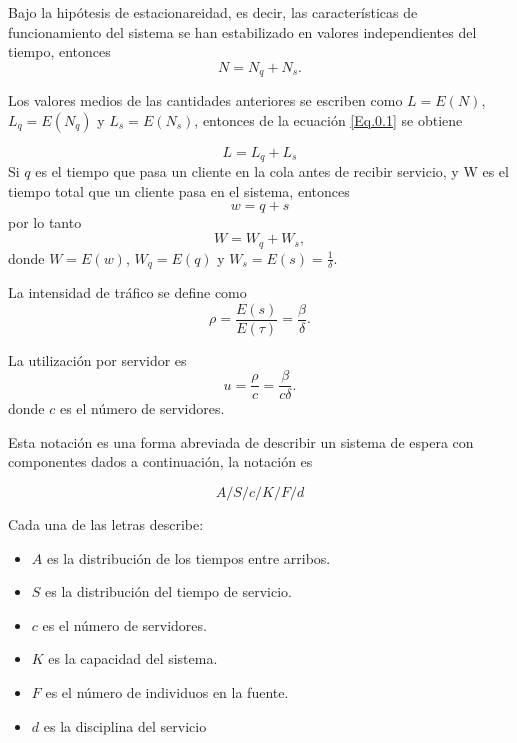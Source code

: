 \documentclass{article}
\begin{document}
Bajo la hip\'otesis de estacionareidad, es decir, las caracter\'isticas de funcionamiento del sistema se han estabilizado en valores independientes del tiempo, entonces
\begin{equation}
N=N_{q}+N_{s}.
\end{equation}

Los valores medios de las cantidades anteriores se escriben como $L=E\left(N\right)$, $L_{q}=E\left(N_{q}\right)$ y $L_{s}=E\left(N_{s}\right)$, entonces de la ecuaci\'on \ref{Eq.0.1} se obtiene

\begin{equation}
L=L_{q}+L_{s}
\end{equation}
Si $q$ es el tiempo que pasa un cliente en la cola antes de recibir servicio, y W es el tiempo total que un cliente pasa en el sistema, entonces \[w=q+s\] por lo tanto \[W=W_{q}+W_{s},\] donde $W=E\left(w\right)$, $W_{q}=E\left(q\right)$ y $W_{s}=E\left(s\right)=\frac{1}{\delta}$.

La intensidad de tr\'afico se define como
\begin{equation}
\rho=\frac{E\left(s\right)}{E\left(\tau\right)}=\frac{\beta}{\delta}.
\end{equation}

La utilizaci\'on por servidor es
\begin{equation}
u=\frac{\rho}{c}=\frac{\beta}{c\delta}.
\end{equation}
donde $c$ es el n\'umero de servidores.

Esta notaci\'on es una forma abreviada de describir un sistema de espera con componentes dados a continuaci\'on, la notaci\'on es

\begin{equation}\label{Notacion.K.L.}
A/S/c/K/F/d
\end{equation}

Cada una de las letras describe:

\begin{itemize}
\item $A$ es la distribuci\'on de los tiempos entre arribos.
\item $S$ es la distribuci\'on del tiempo de servicio.
\item $c$ es el n\'umero de servidores.
\item $K$ es la capacidad del sistema.
\item $F$ es el n\'umero de individuos en la fuente.
\item $d$ es la disciplina del servicio
\end{itemize}
\end{document}
